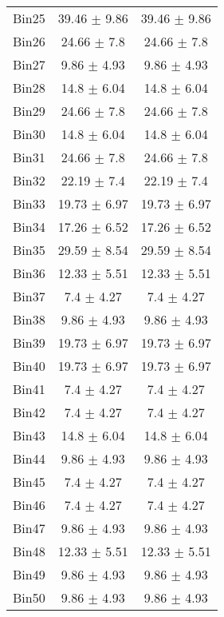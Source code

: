 \begin{tabular}{|c|c|c|}
     Bin25 & 39.46 $\pm$ 9.86 & 39.46 $\pm$ 9.86 \\ \cline{1-3} 
     Bin26 & 24.66 $\pm$ 7.8 & 24.66 $\pm$ 7.8 \\ \cline{1-3} 
     Bin27 & 9.86 $\pm$ 4.93 & 9.86 $\pm$ 4.93 \\ \cline{1-3} 
     Bin28 & 14.8 $\pm$ 6.04 & 14.8 $\pm$ 6.04 \\ \cline{1-3} 
     Bin29 & 24.66 $\pm$ 7.8 & 24.66 $\pm$ 7.8 \\ \cline{1-3} 
     Bin30 & 14.8 $\pm$ 6.04 & 14.8 $\pm$ 6.04 \\ \cline{1-3} 
     Bin31 & 24.66 $\pm$ 7.8 & 24.66 $\pm$ 7.8 \\ \cline{1-3} 
     Bin32 & 22.19 $\pm$ 7.4 & 22.19 $\pm$ 7.4 \\ \cline{1-3} 
     Bin33 & 19.73 $\pm$ 6.97 & 19.73 $\pm$ 6.97 \\ \cline{1-3} 
     Bin34 & 17.26 $\pm$ 6.52 & 17.26 $\pm$ 6.52 \\ \cline{1-3} 
     Bin35 & 29.59 $\pm$ 8.54 & 29.59 $\pm$ 8.54 \\ \cline{1-3} 
     Bin36 & 12.33 $\pm$ 5.51 & 12.33 $\pm$ 5.51 \\ \cline{1-3} 
     Bin37 & 7.4 $\pm$ 4.27 & 7.4 $\pm$ 4.27 \\ \cline{1-3} 
     Bin38 & 9.86 $\pm$ 4.93 & 9.86 $\pm$ 4.93 \\ \cline{1-3} 
     Bin39 & 19.73 $\pm$ 6.97 & 19.73 $\pm$ 6.97 \\ \cline{1-3} 
     Bin40 & 19.73 $\pm$ 6.97 & 19.73 $\pm$ 6.97 \\ \cline{1-3} 
     Bin41 & 7.4 $\pm$ 4.27 & 7.4 $\pm$ 4.27 \\ \cline{1-3} 
     Bin42 & 7.4 $\pm$ 4.27 & 7.4 $\pm$ 4.27 \\ \cline{1-3} 
     Bin43 & 14.8 $\pm$ 6.04 & 14.8 $\pm$ 6.04 \\ \cline{1-3} 
     Bin44 & 9.86 $\pm$ 4.93 & 9.86 $\pm$ 4.93 \\ \cline{1-3} 
     Bin45 & 7.4 $\pm$ 4.27 & 7.4 $\pm$ 4.27 \\ \cline{1-3} 
     Bin46 & 7.4 $\pm$ 4.27 & 7.4 $\pm$ 4.27 \\ \cline{1-3} 
     Bin47 & 9.86 $\pm$ 4.93 & 9.86 $\pm$ 4.93 \\ \cline{1-3} 
     Bin48 & 12.33 $\pm$ 5.51 & 12.33 $\pm$ 5.51 \\ \cline{1-3} 
     Bin49 & 9.86 $\pm$ 4.93 & 9.86 $\pm$ 4.93 \\ \cline{1-3} 
     Bin50 & 9.86 $\pm$ 4.93 & 9.86 $\pm$ 4.93 \\ \cline{1-3} 

\end{tabular}
